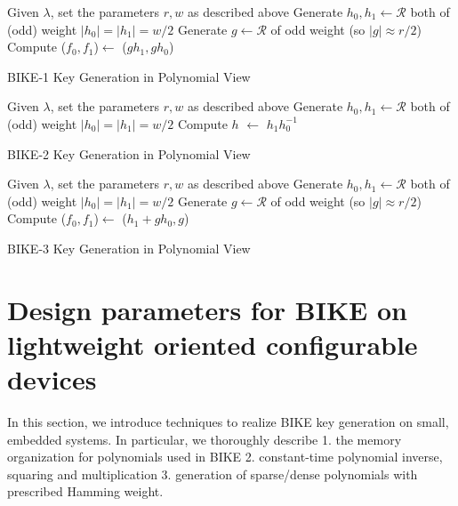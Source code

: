 \documentclass[preprint]{iacrtrans}
\begin{document}
\begin{algorithm}[!tbh]
 \DontPrintSemicolon %
    Given $\lambda$, set the parameters $r,w$ as described above\;
    Generate $h_0,h_1 \gets \mathcal{R}$ both of (odd) weight $|h_0|=|h_1|=w/2$\;
    Generate $g \gets \mathcal{R}$ of odd weight (so $|g|\approx r/2$)\;
    Compute ($f_0,f_1$)$\gets$ ($gh_1,gh_0$)\;
 \caption{BIKE-1 Key Generation in Polynomial View \cite{aragon2017bike}}\label{alg:bike1_keygen}
\end{algorithm}

\begin{algorithm}[!tbh]
 \DontPrintSemicolon %
    Given $\lambda$, set the parameters $r,w$ as described above\;
    Generate $h_0,h_1 \gets \mathcal{R}$ both of (odd) weight $|h_0|=|h_1|=w/2$\;
    Compute $h$ $\gets$ $h_1h_0^{-1}$\;
 \caption{BIKE-2 Key Generation in Polynomial View  \cite{aragon2017bike}}\label{alg:bike2_keygen}
\end{algorithm}

\begin{algorithm}[!tbh]
 \DontPrintSemicolon %
    Given $\lambda$, set the parameters $r,w$ as described above\;
    Generate $h_0,h_1 \gets \mathcal{R}$ both of (odd) weight $|h_0|=|h_1|=w/2$\;
    Generate $g \gets \mathcal{R}$ of odd weight (so $|g|\approx r/2$)\;
    Compute ($f_0,f_1$)$\gets$ ($h_1+gh_0,g$)\;
 \caption{BIKE-3 Key Generation in Polynomial View  \cite{aragon2017bike}}\label{alg:bike3_keygen}
\end{algorithm}


\section{Design parameters for BIKE on lightweight oriented configurable devices}
In this section, we introduce techniques to realize BIKE key generation on small, embedded systems. In particular, we thoroughly describe 1. the memory organization for polynomials used in BIKE 2. constant-time polynomial inverse, squaring and  multiplication 3. generation of sparse/dense polynomials with prescribed Hamming weight.
\end{document}
